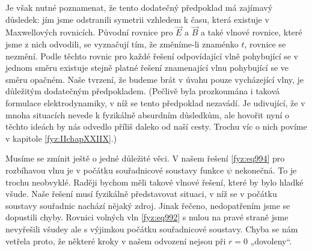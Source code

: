     Je však nutné poznamenat, že tento dodatečný předpoklad má zajímavý důsledek: jím jsme
    odstranili symetrii vzhledem k času, která existuje v Maxwellových rovnicích. Původní rovnice
    pro \(\vec{E}\) a \(\vec{B}\) a také vlnové rovnice, které jsme z nich odvodili, se vyznačují
    tím, že změníme-li znaménko \(t\), rovnice se nezmění. Podle těchto rovnic pro každé řešení
    odpovídající vlně pohybující se v jednom směru existuje stejně platné řešení znamenající vlnu
    pohybující se ve směru opačném. Naše tvrzení, že budeme brát v úvahu pouze vycházející vlny, je
    důležitým dodatečným předpokladem. (Pečlivě byla prozkoumána i taková formulace elektrodynamiky,
    v níž se tento předpoklad nezavádí. Je udivující, že v mnoha situacích nevede k fyzikálně
    absurdním důsledkům, ale hovořit nyní o těchto ideách by nás odvedlo příliš daleko od naší
    cesty. Trochu víc o nich povíme v kapitole \ref{fyz:IIchapXXIIX}.)

    Musíme se zmínit ještě o jedné důležité věci. V našem řešení \eqref{fyz:eq994} pro rozbíhavou
    vlnu je v počátku souřadnicové soustavy funkce \(\psi\) nekonečná. To je trochu neobvyklé.
    Raději bychom měli takové vlnové řešení, které by bylo hladké všude. Naše řešení musí fyzikálně
    představovat situaci, v níž se v počátku soustavy souřadnic nachází nějaký zdroj. Jinak řečeno,
    nedopatřením jsme se dopustili chyby. Rovnici volných vln \eqref{fyz:eq992} s nulou na pravé
    straně jsme nevyřešili všudey ale s výjimkou počátku souřadnicové soustavy. Chyba se nám vetřela
    proto, že některé kroky v našem odvození nejsou při \(r = 0\) „dovoleny“.
    
